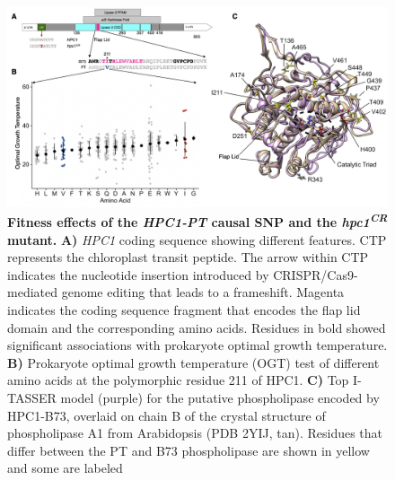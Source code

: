 \documentclass[9pt,twocolumn,twoside,lineno]{biorxiv}
\begin{document}
\begin{figure}[!ht]
\begin{center}
\includegraphics[width=0.8\paperwidth]{Figures/Fig_5.png}
\caption{\textbf{Fitness effects of the \textit{HPC1-PT} causal SNP and the \textit{hpc1\textsuperscript{CR}} mutant.} 
\textbf{A)} \textit{HPC1} coding sequence showing different features. 
CTP represents the chloroplast transit peptide. 
The arrow within CTP indicates the nucleotide insertion introduced by CRISPR/Cas9-mediated genome editing that leads to a frameshift.
Magenta indicates the coding sequence fragment that encodes the flap lid domain and the corresponding amino acids.
Residues in bold showed significant associations with prokaryote optimal growth temperature.
\textbf{B)} Prokaryote optimal growth temperature (OGT) test of different amino acids at the polymorphic residue 211 of HPC1.
\textbf{C)} Top I-TASSER model (purple) for the putative phospholipase encoded by HPC1-B73, overlaid on chain B of the crystal structure of phospholipase A1 from
Arabidopsis (PDB 2YIJ, tan). 
Residues that differ between the PT and B73 phospholipase are shown in yellow and some are labeled} 
\label{Fig5}
\end{center}
\end{figure}
\end{document}
